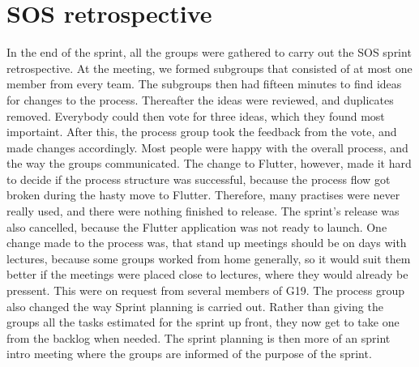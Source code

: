 \section{SOS retrospective}
In the end of the sprint, all the groups were gathered to carry out the SOS sprint retrospective. 
At the meeting, we formed subgroups that consisted of at most one member from every team. 
The subgroups then had fifteen minutes to find ideas for changes to the process. 
Thereafter the ideas were reviewed, and duplicates removed. Everybody could then vote for three ideas, which they found most importaint. 
After this, the process group took the feedback from the vote, and made changes accordingly. 
Most people were happy with the overall process, and the way the groups communicated. 
The change to Flutter, however, made it hard to decide if the process structure was successful, because the process flow got broken during the hasty move to Flutter. Therefore, many practises were never really used, and there were nothing finished to release.
The sprint's release was also cancelled, because the Flutter application was not ready to launch. 
One change made to the process was, that stand up meetings should be on days with lectures, because some groups worked from home generally, so it would suit them better if the meetings were placed close to lectures, where they would already be pressent.
This were on request from several members of G19. 
The process group also changed the way Sprint planning is carried out.
Rather than giving the groups all the tasks estimated for the sprint up front, they now get to take one from the backlog when needed. 
The sprint planning is then more of an sprint intro meeting where the groups are informed of the purpose of the sprint. 

